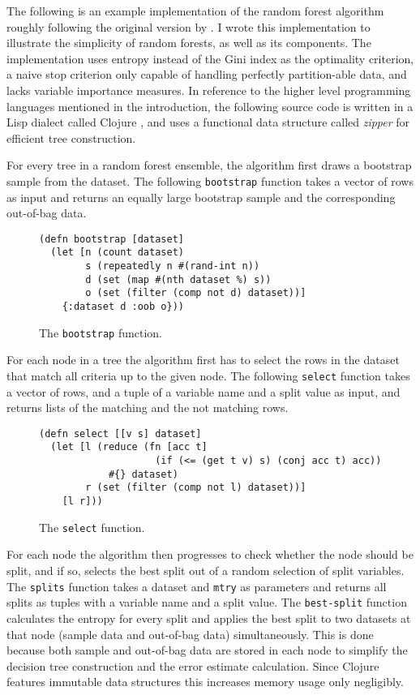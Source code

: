 \documentclass[a4paper,man,12pt,apacite,floatsintext]{apa6} %
\begin{document}
The following is an example implementation of the random forest algorithm
roughly following the original version by .
I wrote this implementation to illustrate the simplicity of random forests,
as well as its components.
The implementation uses entropy instead of the Gini index as the
optimality criterion, a naive stop criterion only capable of handling
perfectly partition-able data, and lacks variable importance measures.
In reference to the higher level programming languages mentioned
in the introduction, the following source code is written in a Lisp
dialect called Clojure \cite{wpCLOJURE}, and uses a functional data structure
called \emph{zipper} \cite{huet1997zipper} for efficient tree construction.

For every tree in a random forest ensemble, the algorithm first draws a
bootstrap sample from the dataset.
The following \texttt{bootstrap} function takes a vector of rows as input
and returns an equally large bootstrap sample and the corresponding out-of-bag data.

\begin{figure}[H]
\caption{The \texttt{bootstrap} function.}
\begin{verbatim}
(defn bootstrap [dataset]
  (let [n (count dataset)
        s (repeatedly n #(rand-int n))
        d (set (map #(nth dataset %) s))
        o (set (filter (comp not d) dataset))]
    {:dataset d :oob o}))
\end{verbatim}
\end{figure}

For each node in a tree the algorithm first has to select the rows in the dataset
that match all criteria up to the given node.
The following \texttt{select} function takes a vector of rows, and a tuple of a variable name
and a split value as input, and returns lists of the matching and the not matching rows.

\begin{figure}[H]
\caption{The \texttt{select} function.}
\begin{verbatim}
(defn select [[v s] dataset]
  (let [l (reduce (fn [acc t]
                    (if (<= (get t v) s) (conj acc t) acc))
            #{} dataset)
        r (set (filter (comp not l) dataset))]
    [l r]))
\end{verbatim}
\end{figure}

For each node the algorithm then progresses to check whether the node should be split,
and if so, selects the best split out of a random selection of split variables.
The \texttt{splits} function takes a dataset and \texttt{mtry} as parameters and
returns all splits as tuples with a variable name and a split value.
The \texttt{best-split} function calculates the entropy for every split and applies
the best split to two datasets at that node (sample data and out-of-bag data) simultaneously.
This is done because both sample and out-of-bag data are stored in each node to
simplify the decision tree construction and the error estimate calculation.
Since Clojure features immutable data structures this increases memory usage only negligibly.
\end{document}
